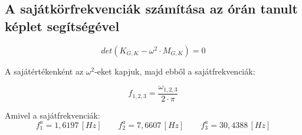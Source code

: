 \documentclass{article}
\begin{document}
		\subsection{A sajátkörfrekvenciák számítása az órán tanult képlet segítségével}
	
			\begin{equation}
				det(K_{G,K} - \omega^2 \cdot M_{G,K}) = 0
			\end{equation}
			
			A sajátértékenként az $\omega^2$-eket kapjuk, majd ebből a sajátfrekvenciák:
			
			\begin{equation}
				f_{1,2,3}=\frac{\omega_{1,2,3}}{2\cdot \pi}
			\end{equation}
			
			Amivel a sajátfrekvenciák:	
				\[f_1^a=1,6197\, [Hz] \qquad f_2^a=7,6607\, [Hz] \qquad f_3^a=30,4388\, [Hz]  \]
\end{document}
